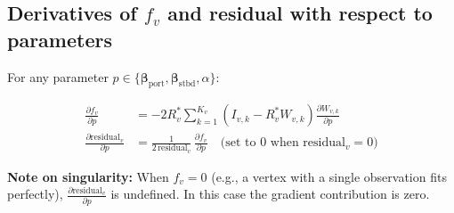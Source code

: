 \documentclass[11pt]{article}
\begin{document}
\subsection{Derivatives of $f_v$ and residual with respect to parameters}

For any parameter $p \in \{\bm{\beta}_\text{port}, \bm{\beta}_\text{stbd}, \alpha\}$:

\begin{align*}
\frac{\partial f_v}{\partial p} &= -2 R_v^* \sum_{k=1}^{K_v} \left(I_{v,k} - R_v^* W_{v,k}\right) \frac{\partial W_{v,k}}{\partial p} \\
\frac{\partial \text{residual}_v}{\partial p} &= \frac{1}{2 \, \text{residual}_v} \, \frac{\partial f_v}{\partial p} \quad \text{(set to 0 when } \text{residual}_v = 0\text{)}
\end{align*}

\textbf{Note on singularity:} When $f_v = 0$ (e.g., a vertex with a single observation fits perfectly), $\frac{\partial \text{residual}_v}{\partial p}$ is undefined. In this case the gradient contribution is zero.
\end{document}
